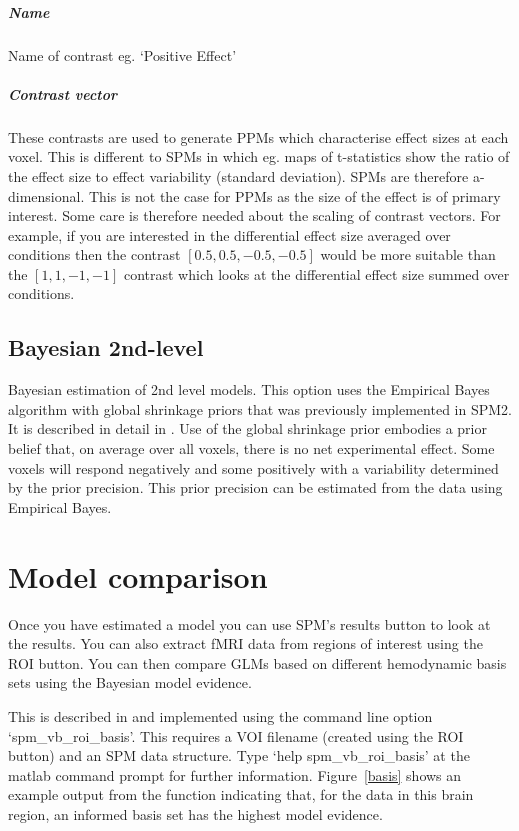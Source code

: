 \documentclass[a4paper,titlepage]{book}
\begin{document}
\subparagraph{Name}
Name of contrast eg. `Positive Effect'


\subparagraph{Contrast vector}
These contrasts are used to generate PPMs which characterise effect sizes at each voxel. This is different to SPMs in which eg. maps of t-statistics show the ratio of the effect size to effect variability (standard deviation). SPMs are therefore a-dimensional. This is not the case for PPMs as the size of the effect is of primary interest. Some care is therefore needed about the scaling of contrast vectors. For example, if you are interested in the differential effect size averaged over conditions then the contrast $[0.5, 0.5, -0.5, -0.5]$ would be more suitable than the $[1, 1, -1, -1]$ contrast which looks at the differential effect size summed over conditions. 


\subsection{Bayesian 2nd-level}
Bayesian estimation of 2nd level models. This option uses the Empirical Bayes algorithm with global shrinkage priors that was previously implemented in SPM2. It is described in detail in \cite{karl_posterior}.
Use of the global shrinkage prior embodies a prior belief that, on average over all voxels, there is no net experimental effect. Some voxels will respond negatively and some positively with a variability determined by the prior precision. This prior precision can be estimated from the data using Empirical Bayes. 


\section{Model comparison}

Once you have estimated a model you can use SPM's results button
to look at the results. You can also extract fMRI data from 
regions of interest using the ROI button. You 
can then compare GLMs based on different hemodynamic basis sets 
using the Bayesian model evidence. 

This is described in \cite{vb4} and implemented 
using the command line option `spm\_vb\_roi\_basis'. This 
requires a VOI filename (created using the ROI button) and an SPM
data structure. Type `help spm\_vb\_roi\_basis' at the matlab command 
prompt for further information. Figure~\ref{basis} shows an 
example output from the function indicating that, for the data in 
this brain region, an informed basis set has the highest model evidence.
\end{document}
